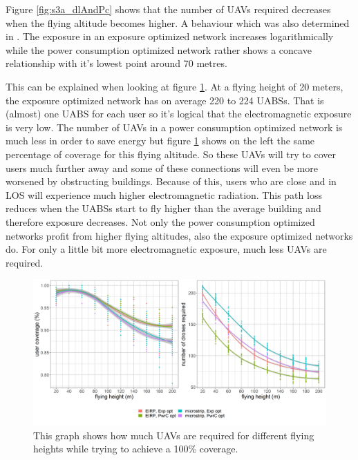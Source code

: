 Figure \ref{fig:s3a_dlAndPc} shows that the number of \gls{UAV}s required decreases when the flying altitude becomes higher.
A behaviour which was also determined in \cite{J2}.
The exposure in an exposure optimized network increases logarithmically while the power consumption optimized network rather 
shows a concave relationship with it's lowest point around 70 metres.

This can be explained when looking at figure \ref{fig:s3a_numDronesAndCov}.
At a flying height of 20 meters, the exposure optimized network has on average 220 to 224 \gls{UABS}s. That is (almost) one \gls{UABS} for each user
so it's logical that the electromagnetic exposure is very low.
The number of \gls{UAV}s in a power consumption optimized network is much less in order 
to save energy but figure \ref{fig:s3a_numDronesAndCov} shows on the left the same percentage of coverage for this flying altitude.
So these \gls{UAV}s will try to cover users much further away and some of these connections will even be more worsened by obstructing buildings.
Because of this, users who are close and in \gls{LOS} will experience much higher electromagnetic radiation.
This path loss reduces when the \gls{UABS}s start to fly higher than the average building and therefore exposure decreases.
Not only the power consumption optimized networks profit from higher flying altitudes, also the exposure optimized networks do. For only a little bit 
more electromagnetic exposure, much less \gls{UAV}s are required.

\begin{figure}[]
  \includegraphics[width=\textwidth]{../results/s3/fhvsnumdronesAndCov.png}
  \caption{This graph shows how much \gls{UAV}s are required for different flying heights while trying to achieve a 100\% coverage.}
  \label{fig:s3a_numDronesAndCov}
\end{figure}

